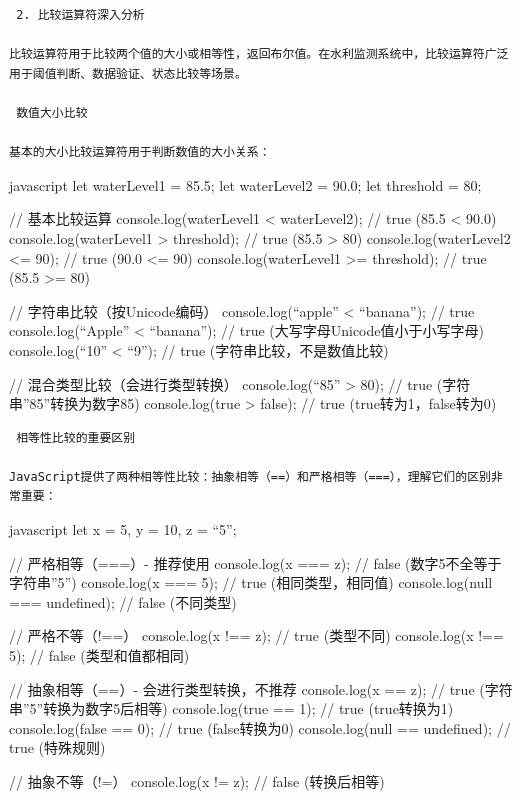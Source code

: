 \begin{lstlisting}
 2. 比较运算符深入分析

比较运算符用于比较两个值的大小或相等性，返回布尔值。在水利监测系统中，比较运算符广泛用于阈值判断、数据验证、状态比较等场景。

 数值大小比较

基本的大小比较运算符用于判断数值的大小关系：
\end{lstlisting}

javascript let waterLevel1 = 85.5; let waterLevel2 = 90.0; let threshold = 80;

// 基本比较运算 console.log(waterLevel1 \textless{} waterLevel2); // true (85.5 \textless{} 90.0) console.log(waterLevel1 \textgreater{} threshold); // true (85.5 \textgreater{} 80) console.log(waterLevel2 \textless= 90); // true (90.0 \textless= 90) console.log(waterLevel1 \textgreater= threshold); // true (85.5 \textgreater= 80)

// 字符串比较（按Unicode编码） console.log(``apple'' \textless{} ``banana''); // true console.log(``Apple'' \textless{} ``banana''); // true (大写字母Unicode值小于小写字母) console.log(``10'' \textless{} ``9''); // true (字符串比较，不是数值比较)

// 混合类型比较（会进行类型转换） console.log(``85'' \textgreater{} 80); // true (字符串''85''转换为数字85) console.log(true \textgreater{} false); // true (true转为1，false转为0)

\begin{lstlisting}
 相等性比较的重要区别

JavaScript提供了两种相等性比较：抽象相等（==）和严格相等（===），理解它们的区别非常重要：
\end{lstlisting}

javascript let x = 5, y = 10, z = ``5'';

// 严格相等（===）- 推荐使用 console.log(x === z); // false (数字5不全等于字符串''5'') console.log(x === 5); // true (相同类型，相同值) console.log(null === undefined); // false (不同类型)

// 严格不等（!==） console.log(x !== z); // true (类型不同) console.log(x !== 5); // false (类型和值都相同)

// 抽象相等（==）- 会进行类型转换，不推荐 console.log(x == z); // true (字符串''5''转换为数字5后相等) console.log(true == 1); // true (true转换为1) console.log(false == 0); // true (false转换为0) console.log(null == undefined); // true (特殊规则)

// 抽象不等（!=） console.log(x != z); // false (转换后相等)

